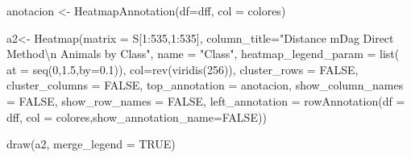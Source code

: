 \documentclass[
  letterpaper,
  DIV=11,
  numbers=noendperiod]{scrreprt}
\newenvironment{Shaded}{\begin{snugshade}}{\end{snugshade}}
\newcommand{\AttributeTok}[1]{\textcolor[rgb]{0.40,0.45,0.13}{#1}}
\newcommand{\ConstantTok}[1]{\textcolor[rgb]{0.56,0.35,0.01}{#1}}
\newcommand{\DecValTok}[1]{\textcolor[rgb]{0.68,0.00,0.00}{#1}}
\newcommand{\FloatTok}[1]{\textcolor[rgb]{0.68,0.00,0.00}{#1}}
\newcommand{\FunctionTok}[1]{\textcolor[rgb]{0.28,0.35,0.67}{#1}}
\newcommand{\NormalTok}[1]{\textcolor[rgb]{0.00,0.23,0.31}{#1}}
\newcommand{\OtherTok}[1]{\textcolor[rgb]{0.00,0.23,0.31}{#1}}
\newcommand{\SpecialCharTok}[1]{\textcolor[rgb]{0.37,0.37,0.37}{#1}}
\newcommand{\StringTok}[1]{\textcolor[rgb]{0.13,0.47,0.30}{#1}}
\begin{document}
\begin{Shaded}
\begin{Highlighting}[]
\NormalTok{anotacion }\OtherTok{\textless{}{-}} \FunctionTok{HeatmapAnnotation}\NormalTok{(}\AttributeTok{df=}\NormalTok{dff, }\AttributeTok{col =}\NormalTok{ colores)}


\NormalTok{a2}\OtherTok{\textless{}{-}} \FunctionTok{Heatmap}\NormalTok{(}\AttributeTok{matrix =}\NormalTok{ S[}\DecValTok{1}\SpecialCharTok{:}\DecValTok{535}\NormalTok{,}\DecValTok{1}\SpecialCharTok{:}\DecValTok{535}\NormalTok{], }
              \AttributeTok{column\_title=}\StringTok{"Distance mDag Direct Method}\SpecialCharTok{\textbackslash{}n}\StringTok{  Animals by Class"}\NormalTok{,}
            \AttributeTok{name =} \StringTok{"Class"}\NormalTok{, }
            \AttributeTok{heatmap\_legend\_param =} \FunctionTok{list}\NormalTok{(}
    \AttributeTok{at =} \FunctionTok{seq}\NormalTok{(}\DecValTok{0}\NormalTok{,}\FloatTok{1.5}\NormalTok{,}\AttributeTok{by=}\FloatTok{0.1}\NormalTok{)),}
        \AttributeTok{col=}\FunctionTok{rev}\NormalTok{(}\FunctionTok{viridis}\NormalTok{(}\DecValTok{256}\NormalTok{)),}
        \AttributeTok{cluster\_rows =} \ConstantTok{FALSE}\NormalTok{,}
        \AttributeTok{cluster\_columns =} \ConstantTok{FALSE}\NormalTok{,}
        \AttributeTok{top\_annotation =}\NormalTok{ anotacion,}
        \AttributeTok{show\_column\_names =} \ConstantTok{FALSE}\NormalTok{, }
        \AttributeTok{show\_row\_names =} \ConstantTok{FALSE}\NormalTok{,}
        \AttributeTok{left\_annotation =} \FunctionTok{rowAnnotation}\NormalTok{(}\AttributeTok{df =}\NormalTok{ dff, }\AttributeTok{col =}\NormalTok{ colores,}\AttributeTok{show\_annotation\_name=}\ConstantTok{FALSE}\NormalTok{))}
  
\FunctionTok{draw}\NormalTok{(a2, }\AttributeTok{merge\_legend =} \ConstantTok{TRUE}\NormalTok{)}
\end{Highlighting}
\end{Shaded}
\end{document}
